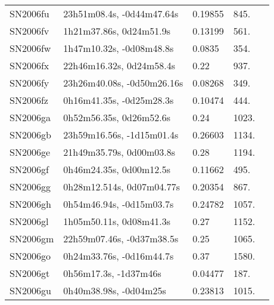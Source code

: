 \begin{longtable}{lllll}
         SN2006fu &      23h51m08.4s, -0d44m47.64s &  0.19855 &           845. &    \citet{2011ApJ...740...92G} \\
         SN2006fv &        1h21m37.86s, 0d24m51.9s &  0.13199 &           561. &    \citet{2003SDSS1.C...0000:} \\
         SN2006fw &       1h47m10.32s, -0d08m48.8s &   0.0835 &           354. &    \citet{2011ApJ...740...92G} \\
         SN2006fx &       22h46m16.32s, 0d24m58.4s &     0.22 &           937. &    \citet{2006CBET..627A...1B} \\
         SN2006fy &     23h26m40.08s, -0d50m26.16s &  0.08268 &           349. &    \citet{2011ApJ...740...92G} \\
         SN2006fz &       0h16m41.35s, -0d25m28.3s &  0.10474 &           444. &    \citet{2003SDSS1.C...0000:} \\
         SN2006ga &        0h52m56.35s, 0d26m52.6s &     0.24 &          1023. &    \citet{2006CBET..627A...1B} \\
         SN2006gb &      23h59m16.56s, -1d15m01.4s &  0.26603 &          1134. &    \citet{2016SDSSD.C...0000:} \\
         SN2006ge &       21h49m35.79s, 0d00m03.8s &     0.28 &          1194. &    \citet{2006CBET..629A...1B} \\
         SN2006gf &        0h46m24.35s, 0d00m12.5s &  0.11662 &           495. &    \citet{2016SDSSD.C...0000:} \\
         SN2006gg &      0h28m12.514s, 0d07m04.77s &  0.20354 &           867. &    \citet{2016SDSSD.C...0000:} \\
         SN2006gh &       0h54m46.94s, -0d15m03.7s &  0.24782 &          1057. &    \citet{2016SDSSD.C...0000:} \\
         SN2006gl &        1h05m50.11s, 0d08m41.3s &     0.27 &          1152. &    \citet{2006CBET..637A...1B} \\
         SN2006gm &      22h59m07.46s, -0d37m38.5s &     0.25 &          1065. &    \citet{2006CBET..637A...1B} \\
         SN2006go &       0h24m33.76s, -0d16m44.7s &     0.37 &          1580. &    \citet{2006CBET..637A...1B} \\
         SN2006gt &          0h56m17.3s, -1d37m46s &  0.04477 &           187. &    \citet{2004AJ....128.1558S} \\
         SN2006gu &         0h40m38.98s, -0d04m25s &  0.23813 &          1015. &    \citet{2016SDSSD.C...0000:} \\

\end{longtable}
